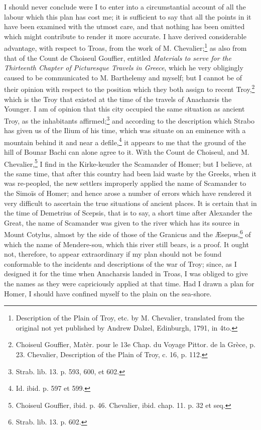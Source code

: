 \documentclass[a4paper, 11pt, oneside, polutonikogreek, english]{article}
\begin{document}
I should never conclude were I to enter into a circumstantial account of all the labour which this plan has cost me; it is sufficient to say that all the points in it have been examined with the utmost care, and that nothing has been omitted which might contribute to render it more accurate. I have derived considerable advantage, with respect to Troas, from the work of M. Chevalier;\footnote{Description of the Plain of Troy, etc. by M. Chevalier, translated from the original not yet published by Andrew Dalzel, Edinburgh, 1791, in 4to.} as also from that of the Count de Choiseul Gouffier, entitled \emph{Materials to serve for the Thirteenth Chapter of Picturesque Travels in Greece}, which he very obligingly caused to be communicated to M. Barthelemy and myself; but I cannot be of their opinion with respect to the position which they both assign to recent Troy,\footnote{Choiseul Gouffier, Matèr. pour le 13e Chap. du Voyage Pittor. de la Grèce, p. 23. Chevalier, Description of the Plain of Troy, c. 16, p. 112.} which is the Troy that existed at the time of the travels of Anacharsis the Younger. I am of opinion that this city occupied the same situation as ancient Troy, as the inhabitants affirmed;\footnote{Strab. lib. 13. p. 593, 600, et 602.} and according to the description which Strabo has given us of the Ilium of his time, which was situate on an eminence with a mountain behind it and near a defile,\footnote{Id. ibid. p. 597 et 599.} it appears to me that the ground of the hill of Bounar Bachi can alone agree to it. With the Count de Choiseul, and M. Chevalier,\footnote{Choiseul Gouffier, ibid. p. 46. Chevalier, ibid. chap. 11. p. 32 et seq.} I find in the Kirke-keuzler the Scamander of Homer; but I believe, at the same time, that after this country had been laid waste by the Greeks, when it was re-peopled, the new settlers improperly applied the name of Scamander to the Simoïs of Homer; and hence arose a number of errors which have rendered it very difficult to ascertain the true situations of ancient places. It is certain that in the time of Demetrius of Scepsis, that is to say, a short time after Alexander the Great, the name of Scamander was given to the river which has its source in Mount Cotylus, almost by the side of those of the Granicus and the Æsepus,\footnote{Strab. lib. 13. p. 602.} of which the name of Mendere-sou, which this river still bears, is a proof. It ought not, therefore, to appear extraordinary if my plan should not be found conformable to the incidents and descriptions of the war of Troy; since, as I designed it for the time when Anacharsis landed in Troas, I was obliged to give the names as they were capriciously applied at that time. Had I drawn a plan for Homer, I should have confined myself to the plain on the sea-shore.
\end{document}
